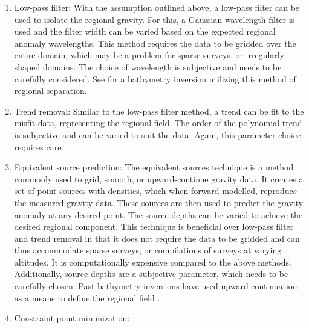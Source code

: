 \begin{enumerate}
    \item Low-pass filter:
        With the assumption outlined above, a low-pass filter can be used to isolate the regional gravity. For this, a Gaussian wavelength filter is used and the filter width can be varied based on the expected regional anomaly wavelengths. This method requires the data to be gridded over the entire domain, which may be a problem for sparse surveys. or irregularly shaped domains. The choice of wavelength is subjective and needs to be carefully considered. See \citet{eisermannbathymetry2020} for a bathymetry inversion utilizing this method of regional separation. 
    \item Trend removal:
        Similar to the low-pass filter method, a trend can be fit to the misfit data, representing the regional field. The order of the polynomial trend is subjective and can be varied to suit the data. Again, this parameter choice requires care.
    \item Equivalent source prediction:
        The equivalent sources technique is a method commonly used to grid, smooth, or upward-continue gravity data. It creates a set of point sources with densities, which when forward-modelled, reproduce the measured gravity data. These sources are then used to predict the gravity anomaly at any desired point. The source depths can be varied to achieve the desired regional component. This technique is beneficial over low-pass filter and trend removal in that it does not require the data to be gridded and can thus accommodate sparse surveys, or compilations of surveys at varying altitudes. It is computationally expensive compared to the above methods. Additionally, source depths are a subjective parameter, which needs to be carefully chosen. Past bathymetry inversions have used upward continuation as a means to define the regional field \citep[e.g.,][]{tintobathymetry2015}.
    \item Constraint point minimization:

\end{enumerate}
